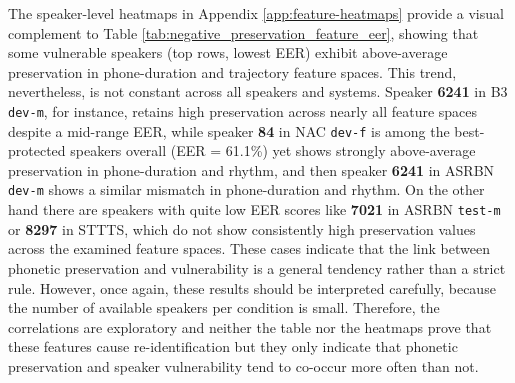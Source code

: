 \documentclass[12pt,leqno,a4paper]{article}
\begin{document}
The speaker-level heatmaps in Appendix \ref{app:feature-heatmaps} provide a visual complement to Table \ref{tab:negative_preservation_feature_eer}, showing that some vulnerable speakers (top rows, lowest EER) exhibit above-average preservation in phone-duration and trajectory feature spaces. This trend, nevertheless, is not constant across all speakers and systems. Speaker \textbf{6241} in B3 \texttt{dev-m}, for instance, retains high preservation across nearly all feature spaces despite a mid-range EER, while speaker \textbf{84} in NAC \texttt{dev-f} is among the best-protected speakers overall (EER = 61.1\%) yet shows strongly above-average preservation in phone-duration and rhythm, and then speaker \textbf{6241} in ASRBN \texttt{dev-m} shows a similar mismatch in phone-duration and rhythm. 
On the other hand there are speakers with quite low EER scores like \textbf{7021} in ASRBN \texttt{test-m} or \textbf{8297} in STTTS, which do not show consistently high preservation values across the examined feature spaces.
These cases indicate that the link between phonetic preservation and vulnerability is a general tendency rather than a strict rule.
However, once again, these results should be interpreted carefully, because the number of available speakers per condition is small. Therefore, the correlations are exploratory and neither the table nor the heatmaps prove that these features cause re-identification but they only indicate that phonetic preservation and speaker vulnerability tend to co-occur more often than not.

\end{document}
